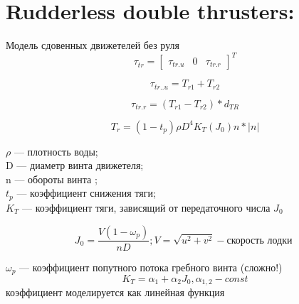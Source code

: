 \newpage
\section*{Rudderless double thrusters:}

Модель сдовенных движетелей без руля \\

\begin{equation*}
    \tau_{tr} = \begin{bmatrix} \tau_{tr.u} & 0 & \tau_{tr.r}  \end{bmatrix}^T
\end{equation*}

\begin{equation*}
    \tau_{tr..u} = T_{r1} + T_{r2}
\end{equation*}

\begin{equation*}
    \tau_{tr.r} = (T_{r1} - T_{r2})*d_{TR}
\end{equation*}

\noindent{\rule{4cm}{0.4pt}}

\begin{equation}\label{1}
    T_r = (1 - t_p)\rho D^4K_T(J_0)n*|n|  
\end{equation}

${\rho}$ --- плотность воды; \\

D --- диаметр винта движетеля; \\

n --- обороты винта ; \\

${t_p}$ --- коэффициент снижения тяги; \\

${K_T}$ --- коэффициент тяги, зависящий от передаточного числа ${J_0}$

\noindent{\rule{4cm}{0.4pt}}

\begin{equation}\label{2}
    J_0 = \frac{V(1 - \omega_p)}{nD}; V = \sqrt{u^2 + v^2} - \textit{скорость лодки } 
\end{equation}

${\omega_p}$ --- коэффициент попутного потока гребного винта (сложно!) \\

\begin{equation}\label{3}
    K_T = \alpha_1 + \alpha_2J_0,  \alpha_{1, 2} -  \textit {const} 
\end{equation}
коэффициент моделируется как линейная функция \\

